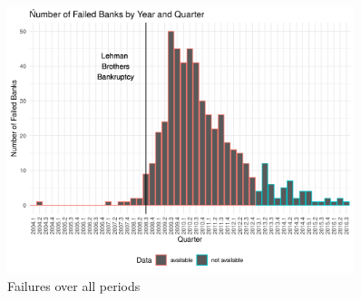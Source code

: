 \documentclass[12pt,a4paper]{article}
\begin{document}
\begin{figure}[]
	\centering
  \includegraphics[width=0.9\textwidth]{failures_by_quarter_complete_with_text.png}
	\caption{Failures over all periods}
	\label{fig:failures_by_quarter}
\end{figure}
\end{document}
